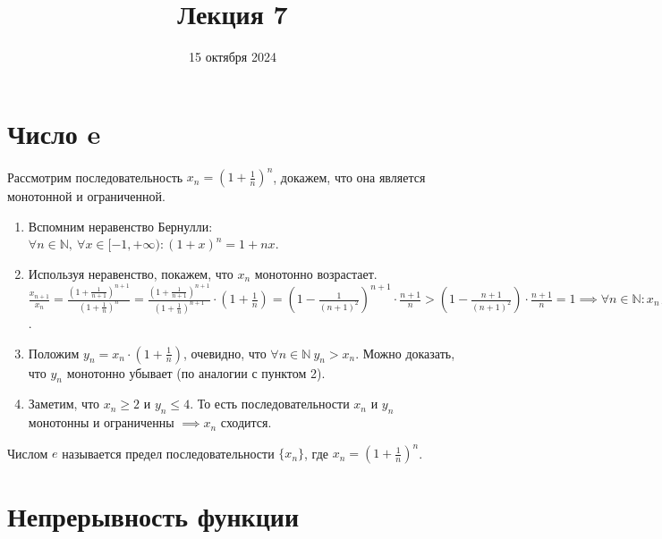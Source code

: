 \documentclass{article}
\title{Лекция 7}
\author{}
\date{15 октября 2024}
\begin{document}
\maketitle

\section{Число e}
Рассмотрим последовательность \(\displaystyle x_{n} = \left(1 + \frac{1}{n}\right)^{n}\), докажем, что она является монотонной и ограниченной.\\
\begin{enumerate}
    \item Вспомним неравенство Бернулли: \(\displaystyle \forall n \in \mathbb{N},\ \forall x \in {[-1, +\infty)}: (1 + x)^{n} = 1 + nx\).
    \item Используя неравенство, покажем, что \(x_{n}\) монотонно возрастает.
    \(\displaystyle \frac{x_{n + 1}}{x_{n}} = \displaystyle \frac{\displaystyle \left(1 + \frac{1}{n + 1}\right)^{n + 1}}{\displaystyle \left(1 + \frac{1}{n}\right)^{n}} = \frac{\displaystyle \left(1 + \frac{1}{n + 1}\right)^{n + 1}}{\displaystyle \left(1 + \frac{1}{n}\right)^{n + 1}} \cdot \left(1 + \frac{1}{n}\right) = \left(1 - \frac{1}{(n + 1)^2}\right)^{n + 1} \cdot \frac{n + 1}{n} > \left(1 - \frac{n + 1}{(n + 1)^2}\right) \cdot \frac{n + 1}{n} = 1 \implies \forall n \in \mathbb{N}: x_{n + 1} > x_{n}\).     
    \item Положим \(\displaystyle y_{n} = x_{n} \cdot \left(1 + \frac{1}{n}\right)\), очевидно, что \(\displaystyle \forall n \in \mathbb{N}\ y_{n} > x_{n}\). Можно доказать, что \(y_{n}\) монотонно убывает (по аналогии с пунктом 2).
    \item Заметим, что \(x_{n} \geq 2\) и \(y_{n} \leq 4\). То есть последовательности \(x_{n}\) и \(y_{n}\) монотонны и ограниченны \(\implies x_{n}\) сходится. 
\end{enumerate}

\begin{definition}
    Числом \(e\) называется предел последовательности \(\{x_n\}\), где \(x_{n} = \left(1 + \frac{1}{n}\right)^{n}\).  
\end{definition}

\section{Непрерывность функции}
\end{document}
